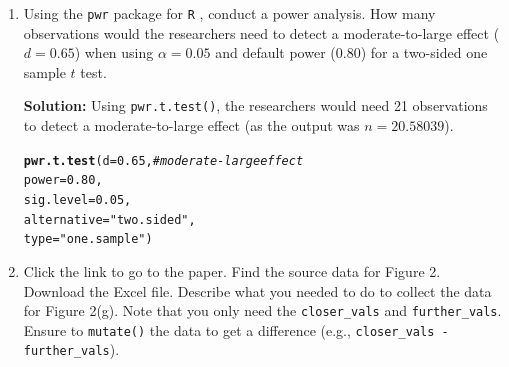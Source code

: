 \documentclass{article}\usepackage[]{graphicx}\usepackage[]{xcolor}
\makeatletter
\newcommand{\hlnum}[1]{\textcolor[rgb]{0.686,0.059,0.569}{#1}}%
\newcommand{\hlsng}[1]{\textcolor[rgb]{0.192,0.494,0.8}{#1}}%
\newcommand{\hlcom}[1]{\textcolor[rgb]{0.678,0.584,0.686}{\textit{#1}}}%
\newcommand{\hldef}[1]{\textcolor[rgb]{0.345,0.345,0.345}{#1}}%
\newcommand{\hlkwc}[1]{\textcolor[rgb]{0.333,0.667,0.333}{#1}}%
\newcommand{\hlkwd}[1]{\textcolor[rgb]{0.737,0.353,0.396}{\textbf{#1}}}%
\newenvironment{kframe}{%
 \def\at@end@of@kframe{}%
 \ifinner\ifhmode%
  \def\at@end@of@kframe{\end{minipage}}%
  \begin{minipage}{\columnwidth}%
 \fi\fi%
 \def\FrameCommand##1{\hskip\@totalleftmargin \hskip-\fboxsep
 \colorbox{shadecolor}{##1}\hskip-\fboxsep
     \hskip-\linewidth \hskip-\@totalleftmargin \hskip\columnwidth}%
 \MakeFramed {\advance\hsize-\width
   \@totalleftmargin\z@ \linewidth\hsize
   \@setminipage}}%
 {\par\unskip\endMakeFramed%
 \at@end@of@kframe}
\newenvironment{knitrout}{}{} %
\makeatother
\begin{document}
\begin{enumerate}
\item Using the \texttt{pwr} package for \texttt{R} \citep{pwr},
conduct a power analysis. How many observations would the researchers 
need to detect a moderate-to-large effect ($d=0.65$) when using 
$\alpha=0.05$ and default power (0.80) for a two-sided one sample 
$t$ test.

\textbf{Solution:} Using \texttt{pwr.t.test()}, the researchers would need 21 observations to detect a moderate-to-large effect (as the output was $n = 20.58039$).


\begin{knitrout}\scriptsize
{}\color{fgcolor}\begin{kframe}
\begin{alltt}
\hlkwd{pwr.t.test}\hldef{(}\hlkwc{d} \hldef{=} \hlnum{0.65}\hldef{,} \hlcom{# moderate-large effect}
           \hlkwc{power} \hldef{=} \hlnum{0.80}\hldef{,}
           \hlkwc{sig.level} \hldef{=} \hlnum{0.05}\hldef{,}
           \hlkwc{alternative} \hldef{=} \hlsng{"two.sided"}\hldef{,}
           \hlkwc{type} \hldef{=} \hlsng{"one.sample"}\hldef{)}
\end{alltt}
\end{kframe}
\end{knitrout}
\item Click the link to go to the paper. Find the source data for 
Figure 2. Download the Excel file. Describe what you needed to
do to collect the data for Figure 2(g). Note that you only need the 
\texttt{closer\_vals} and \texttt{further\_vals}. Ensure to 
\texttt{mutate()} the data to get a difference 
(e.g., \texttt{closer\_vals - further\_vals}).


\end{enumerate}
\end{document}
